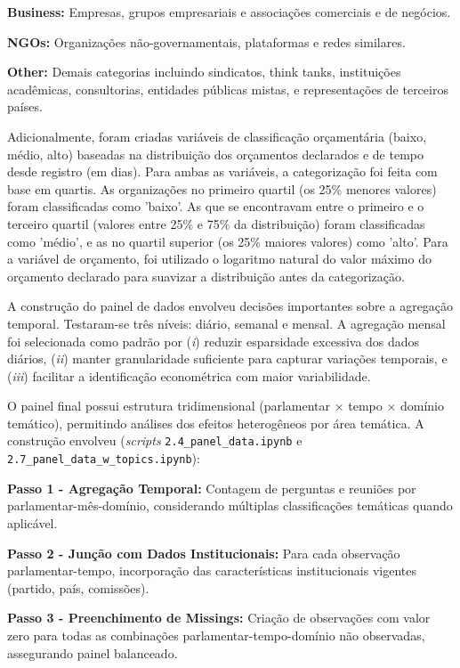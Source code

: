 \textbf{Business:} Empresas, grupos empresariais e associações comerciais e de negócios.

\textbf{NGOs:} Organizações não-governamentais, plataformas e redes similares.

\textbf{Other:} Demais categorias incluindo sindicatos, think tanks, instituições acadêmicas, consultorias, entidades públicas mistas, e representações de terceiros países.

Adicionalmente, foram criadas variáveis de classificação orçamentária (baixo, médio, alto) baseadas na distribuição dos orçamentos declarados e de tempo desde registro (em dias). Para ambas as variáveis, a categorização foi feita com base em quartis. As organizações no primeiro quartil (os 25\% menores valores) foram classificadas como 'baixo'. As que se encontravam entre o primeiro e o terceiro quartil (valores entre 25\% e 75\% da distribuição) foram classificadas como 'médio', e as no quartil superior (os 25\% maiores valores) como 'alto'. Para a variável de orçamento, foi utilizado o logaritmo natural do valor máximo do orçamento declarado para suavizar a distribuição antes da categorização.

A construção do painel de dados envolveu decisões importantes sobre a agregação temporal. Testaram-se três níveis: diário, semanal e mensal. A agregação mensal foi selecionada como padrão por (\textit{i}) reduzir esparsidade excessiva dos dados diários, (\textit{ii}) manter granularidade suficiente para capturar variações temporais, e (\textit{iii}) facilitar a identificação econométrica com maior variabilidade.

O painel final possui estrutura tridimensional (parlamentar × tempo × domínio temático), permitindo análises dos efeitos heterogêneos por área temática. A construção envolveu (\textit{scripts} \texttt{2.4\_panel\_data.ipynb} e \allowbreak\texttt{2.7\_panel\_data\_w\_topics.ipynb}):

\textbf{Passo 1 - Agregação Temporal:} Contagem de perguntas e reuniões por parlamentar-mês-domínio, considerando múltiplas classificações temáticas quando aplicável.

\textbf{Passo 2 - Junção com Dados Institucionais:} Para cada observação parlamentar-tempo, incorporação das características institucionais vigentes (partido, país, comissões).

\textbf{Passo 3 - Preenchimento de Missings:} Criação de observações com valor zero para todas as combinações parlamentar-tempo-domínio não observadas, assegurando painel balanceado.


